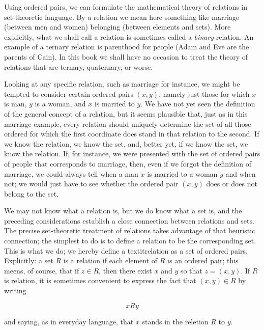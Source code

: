 
Using ordered pairs, we can formulate the mathematical theory of relations in set-theoretic language. By a relation we mean here something like marriage (between men and women) belonging (between elements and sets).  More explicitly, what we shall call a relation is sometimes called a \textit{binary} relation. An example of a ternary relation is parenthood for people (Adam and Eve are the parents of Cain). In this book we shall have no occasion to treat the theory of relations that are ternary, quaternary, or worse. 

Looking at any specific relation, such as marriage for instance, we might be tempted to consider certain ordered pairs $(x,y)$, namely just those for which $x$ is man, $y$ is a woman, and $x$ is married to $y$. We have not yet seen the definition of the general concept of a relation, but it seems plausible that, just as in this marriage example, every relation should uniquely determine the set of all those ordered for which the first coordinate does stand in that relation to the second. If we know the relation, we know the set, and, better yet, if we know the set, we know the relation. If, for instance, we were presented with the set of ordered pairs of people that corresponds to marriage, then, even if we forgot the definition of marriage, we could always tell when a man $x$ is married to a woman $y$ and when not; we would just have to see whether the ordered pair $(x,y)$ does or does not belong to the set.

We may not know what a relation is, but we do know what a set is, and the preceding considerations establish a close connection between relations and sets. The precise set-theoretic treatment of relations takes advantage of that heuristic connection; the simplest to do is to define a relation to be the corresponding set. This is what we do; we hereby define a textit{relation} as a set of ordered pairs. Explicitly: a set $R$ is a relation if each element of $R $ is an ordered pair; this meens, of course, that if $z \in R $, then there exist $x$ and $y$ so that $z = (x,y)$. If $R $ is relation, it is sometimes convenient to express the fact that $(x, y) \in R $ by writing 

\begin{equation*}
x R  y
\end{equation*}

and saying, as in everyday language, that $x$ stands in the reletion $R $ to $y$. 

